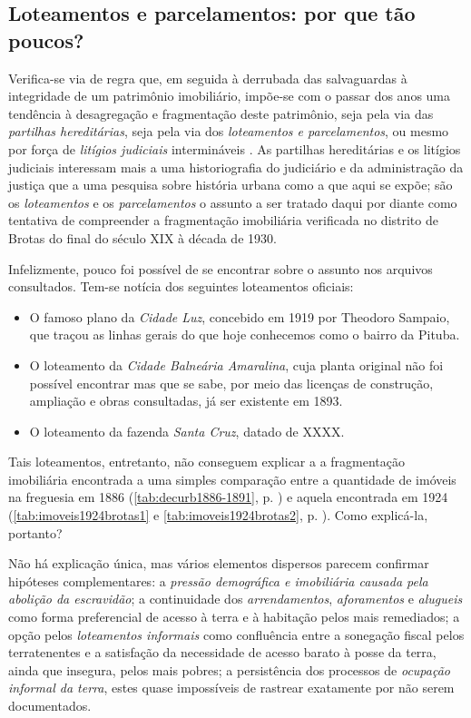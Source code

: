 \subsection{Loteamentos e parcelamentos: por que tão poucos?}\label{subsec:loteamentos}

Verifica-se via de regra que, em seguida à derrubada das salvaguardas à integridade de um patrimônio imobiliário, impõe-se com o passar dos anos uma tendência à desagregação e fragmentação deste patrimônio, seja pela via das \textit{partilhas hereditárias}, seja pela via dos \textit{loteamentos e parcelamentos}, ou mesmo por força de \textit{litígios judiciais} intermináveis \cite{costaporto_sesmaria_1980,sodero_diragrario_1990}. As partilhas hereditárias e os litígios judiciais interessam mais a uma historiografia do judiciário e da administração da justiça que a uma pesquisa sobre história urbana como a que aqui se expõe; são os \textit{loteamentos} e os \textit{parcelamentos} o assunto a ser tratado daqui por diante como tentativa de compreender a fragmentação imobiliária verificada no distrito de Brotas do final do século XIX à década de 1930.

Infelizmente, pouco foi possível de se encontrar sobre o assunto nos arquivos consultados. Tem-se notícia dos seguintes loteamentos oficiais:

\begin{itemize}
\item O famoso plano da \textit{Cidade Luz}, concebido em 1919 por Theodoro Sampaio, que traçou as linhas gerais do que hoje conhecemos como o bairro da Pituba.
\item O loteamento da \textit{Cidade Balneária Amaralina}, cuja planta original não foi possível encontrar mas que se sabe, por meio das licenças de construção, ampliação e obras consultadas, já ser existente em 1893.
\item O loteamento da fazenda \textit{Santa Cruz}, datado de XXXX.
\end{itemize} 

Tais loteamentos, entretanto, não conseguem explicar a a fragmentação imobiliária encontrada a uma simples comparação entre a quantidade de imóveis na freguesia em 1886 (\autoref{tab:decurb1886-1891}, p. \pageref{tab:decurb1886-1891}) e aquela encontrada em 1924 (\autoref{tab:imoveis1924brotas1} e \autoref{tab:imoveis1924brotas2}, p. \pageref{tab:imoveis1924brotas2}). Como explicá-la, portanto?

Não há explicação única, mas vários elementos dispersos parecem confirmar hipóteses complementares: a \textit{pressão demográfica e imobiliária causada pela abolição da escravidão}; a continuidade dos \textit{arrendamentos}, \textit{aforamentos} e \textit{alugueis} como forma preferencial de acesso à terra e à habitação pelos mais remediados; a opção pelos \textit{loteamentos informais} como confluência entre a sonegação fiscal pelos terratenentes e a satisfação da necessidade de acesso barato à posse da terra, ainda que insegura, pelos mais pobres; a persistência dos processos de \textit{ocupação informal da terra}, estes quase impossíveis de rastrear exatamente por não serem documentados.

